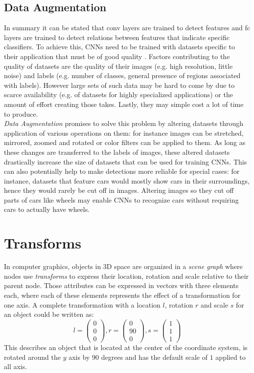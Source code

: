 \subsection{Data Augmentation}
In summary it can be stated that \ac{conv} layers are trained to detect features and \ac{fc} layers are trained to detect relations between features that indicate specific classifiers. To achieve this, \acp{CNN} need to be trained with datasets specific to their application that must be of good quality \cite{Schweitzer2017}. Factors contributing to the quality of datasets are the quality of their images (e.g. high resolution, little noise) and labels (e.g. number of classes, general presence of regions associated with labels). However large sets of such data may be hard to come by due to scarce availability (e.g. of datasets for highly specialized applications) or the amount of effort creating those takes. Lastly, they may simple cost a lot of time to produce.\\
\textit{Data Augmentation} promises to solve this problem by altering datasets through application of various operations on them: for instance images can be stretched, mirrored, zoomed and rotated or color filters can be applied to them. As long as these changes are transferred to the labels of images, these altered datasets drastically increase the size of datasets that can be used for training \acp{CNN}. This can also potentially help to make detections more reliable for special cases: for instance, datasets that feature cars would mostly show cars in their surroundings, hence they would rarely be cut off in images. Altering images so they cut off parts of cars like wheels may enable \acp{CNN} to recognize cars without requiring cars to actually have wheels.
\clearpage

\section{Transforms}
\label{ch03-transforms}
In computer graphics, objects in 3D space are organized in a \emph{scene graph} where nodes use \emph{transforms} to express their location, rotation and scale relative to their parent node. Those attributes can be expressed in vectors with three elements each, where each of these elements represents the effect of a transformation for one axis. A complete transformation with a location $l$, rotation $r$ and scale $s$ for an object could be written as:
\begin{equation}
    l = \begin{pmatrix} 0\\0\\0\end{pmatrix}, r = \begin{pmatrix} 0\\90\\0\end{pmatrix},  s = \begin{pmatrix} 1\\1\\1\end{pmatrix}
\end{equation}
This describes an object that is located at the center of the coordinate system, is rotated around the $y$ axis by $90$ degrees and has the default scale of $1$ applied to all axis.
